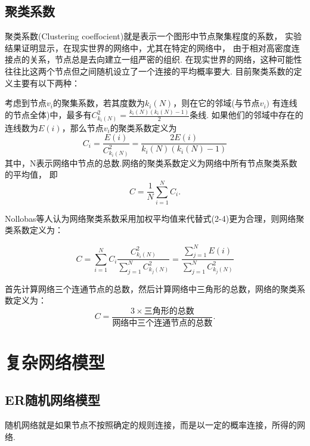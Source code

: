 \documentclass[bachelor,adobefonts]{jnuthesis}
\begin{document}
\subsection{聚类系数}
聚类系数(Clustering coeffocient)就是表示一个图形中节点聚集程度的系数，
实验结果证明显示，在现实世界的网络中，尤其在特定的网络中，
由于相对高密度连接点的关系，节点总是去向建立一组严密的组织.
在现实世界的网络，这种可能性往往比这两个节点但之间随机设立了一个连接的平均概率要大.
目前聚类系数的定义主要有以下两种：

\begin{definition}
  考虑到节点$v_i$的聚集系数，若其度数为$k_i(N)$，则在它的邻域(与节点$v_i)$
  有连线的节点全体)中，最多有$C_{k_i(N)}^{2} = \frac{k_i(N)(k_i(N)-1)}{2}$条线.
  如果他们的邻域中存在的连线数为$E(i)$，那么节点$v_i$的聚类系数定义为
  \begin{equation}
    C_i = \frac{E(i)}{C_{k_i(N)}^{2}} = \frac{2E(i)}{k_i(N)(k_i(N)-1)}
  \end{equation}
  其中，N表示网络中节点的总数.网络的聚类系数定义为网络中所有节点聚类系数的平均值，
  即
  \begin{equation}
    C = \frac{1}{N}\sum_{i = 1}^{N}C_i.
  \end{equation}
\end{definition}

Nollobas等人认为网络聚类系数采用加权平均值来代替式(2-4)更为合理，则网络聚类系数定义为：

\begin{equation}
  C = \sum_{i=1}^{N}C_i \frac{C_{k_i(N)}^{2}}{\sum_{j=1}^{N}C_{k_j(N)}^{2}}
    = \frac{\sum_{j=1}^{N}E(i)}{\sum_{j=1}^{N}C_{k_j(N)}^{2}}
\end{equation}

\begin{definition}
首先计算网络三个连通节点的总数，然后计算网络中三角形的总数，网络的聚类系数定义为：
  \begin{equation}
    C = \frac{3 \times \text{三角形的总数}}{\text{网络中三个连通节点的总数}}.
  \end{equation}
\end{definition}



\section{复杂网络模型}
\subsection{ER随机网络模型}
随机网络就是如果节点不按照确定的规则连接，而是以一定的概率连接，所得的网络.
\end{document}
